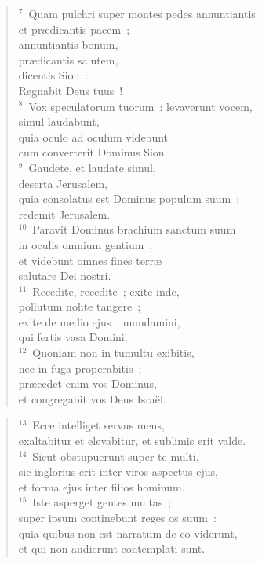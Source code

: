 \begin{flushleft}\begin{verse}${}^{7}$~Quam pulchri super montes pedes annuntiantis\\ et pr\ae dicantis pacem~;\\ annuntiantis bonum,\\ pr\ae dicantis salutem,\\ dicentis Sion~:\\ Regnabit Deus tuus~!\\
${}^{8}$~Vox speculatorum tuorum~: levaverunt vocem,\\ simul laudabunt,\\ quia oculo ad oculum videbunt\\ cum converterit Dominus Sion.\\
${}^{9}$~Gaudete, et laudate simul,\\ deserta Jerusalem,\\ quia consolatus est Dominus populum suum~;\\ redemit Jerusalem.\\
${}^{10}$~Paravit Dominus brachium sanctum suum\\ in oculis omnium gentium~;\\ et videbunt omnes fines terr\ae \\ salutare Dei nostri.\\
${}^{11}$~Recedite, recedite~; exite inde,\\ pollutum nolite tangere~;\\ exite de medio ejus~; mundamini,\\ qui fertis vasa Domini.\\
${}^{12}$~Quoniam non in tumultu exibitis,\\ nec in fuga properabitis~;\\ pr\ae cedet enim vos Dominus,\\ et congregabit vos Deus Isra\"el.\end{verse}\end{flushleft}


\begin{flushleft}\begin{verse}${}^{13}$~Ecce intelliget servus meus,\\ exaltabitur et elevabitur, et sublimis erit valde.\\
${}^{14}$~Sicut obstupuerunt super te multi,\\ sic inglorius erit inter viros aspectus ejus,\\ et forma ejus inter filios hominum.\\
${}^{15}$~Iste asperget gentes multas~;\\ super ipsum continebunt reges os suum~:\\ quia quibus non est narratum de eo viderunt,\\ et qui non audierunt contemplati sunt.\end{verse}\end{flushleft}


